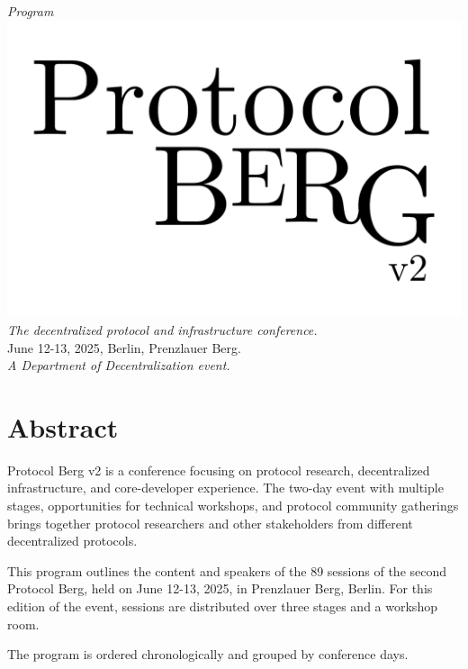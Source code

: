 \begin{titlepage}
  \begin{center}
    \textit{\huge Program}\\[1em]
    \includegraphics[width=\textwidth]{protocol.pdf}\\[1em]
    \textit{The decentralized protocol and infrastructure conference.}\\
    {June 12-13, 2025, Berlin, Prenzlauer Berg.}\\[1em]
    \vspace{\fill}
    \textit{\small A Department of Decentralization event.}
  \end{center}
\end{titlepage}

\pagestyle{fancy}

\cleardoublepage

\section*{Abstract}
Protocol Berg v2 is a conference focusing on protocol research, decentralized
infrastructure, and core-developer experience. The two-day event with multiple
stages, opportunities for technical workshops, and protocol community gatherings
brings together protocol researchers and other stakeholders from different
decentralized protocols.

This program outlines the content and speakers of the 89 sessions of the second
Protocol Berg, held on June 12-13, 2025, in Prenzlauer Berg, Berlin. For this
edition of the event, sessions are distributed over three stages and a workshop
room.

The program is ordered chronologically and grouped by conference days.

\cleardoublepage

\tableofcontents

\cleardoublepage
